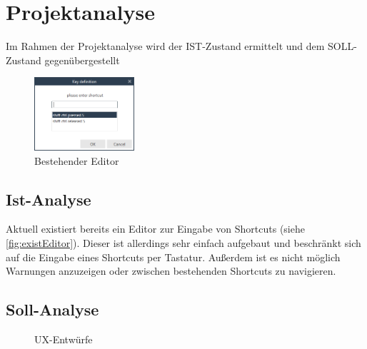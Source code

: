 \section{Projektanalyse}

Im Rahmen der Projektanalyse wird der IST-Zustand ermittelt und dem SOLL-Zustand gegenübergestellt

\begin{figure}
	\vspace{-40px}
	\centering
	\includegraphics[width=140px]{../img/Alter-Editor.PNG}
	\caption{Bestehender Editor}
	\label{fig:existEditor}
\end{figure}

\subsection{Ist-Analyse}

Aktuell existiert bereits ein Editor zur Eingabe von Shortcuts (siehe \autoref{fig:existEditor}). Dieser ist allerdings sehr einfach aufgebaut und beschränkt sich auf die Eingabe eines Shortcuts per Tastatur. Außerdem ist es nicht möglich Warnungen anzuzeigen oder zwischen bestehenden Shortcuts zu navigieren.

\subsection{Soll-Analyse}



\vfill

\begin{figure}[H] 
	\caption{UX-Entwürfe} 
\end{figure}

\newpage